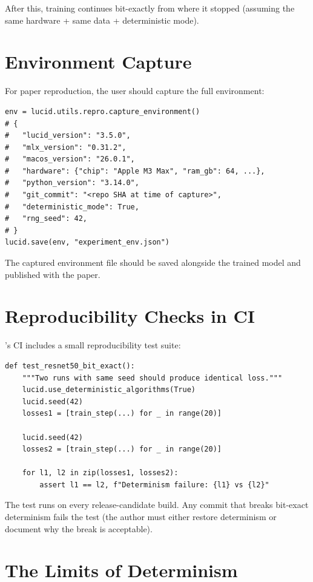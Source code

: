After this, training continues bit-exactly from where it
stopped (assuming the same hardware + same data + deterministic
mode).

\section{Environment Capture}
\label{sec:reproducibility:env_capture}

For paper reproduction, the user should capture the full
environment:

\begin{lstlisting}[style=lucid,language=LucidPython]
env = lucid.utils.repro.capture_environment()
# {
#   "lucid_version": "3.5.0",
#   "mlx_version": "0.31.2",
#   "macos_version": "26.0.1",
#   "hardware": {"chip": "Apple M3 Max", "ram_gb": 64, ...},
#   "python_version": "3.14.0",
#   "git_commit": "<repo SHA at time of capture>",
#   "deterministic_mode": True,
#   "rng_seed": 42,
# }
lucid.save(env, "experiment_env.json")
\end{lstlisting}

The captured environment file should be saved alongside the
trained model and published with the paper.

\section{Reproducibility Checks in CI}
\label{sec:reproducibility:ci_check}

\Lucid's CI includes a small reproducibility test suite:

\begin{lstlisting}[style=lucid,language=LucidPython]
def test_resnet50_bit_exact():
    """Two runs with same seed should produce identical loss."""
    lucid.use_deterministic_algorithms(True)
    lucid.seed(42)
    losses1 = [train_step(...) for _ in range(20)]

    lucid.seed(42)
    losses2 = [train_step(...) for _ in range(20)]

    for l1, l2 in zip(losses1, losses2):
        assert l1 == l2, f"Determinism failure: {l1} vs {l2}"
\end{lstlisting}

The test runs on every release-candidate build. Any commit
that breaks bit-exact determinism fails the test (the author
must either restore determinism or document why the break is
acceptable).

\section{The Limits of Determinism}
\label{sec:reproducibility:limits}

